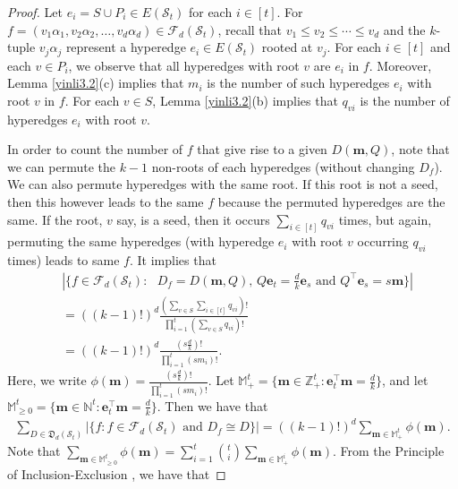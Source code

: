 \documentclass{article}
\begin{document}
\begin{proof}
Let $e_{i}=S \cup P_{i} \in E(\mathcal{S}_t)$ for each $i \in [t]$.
For $f=(v_1\alpha_1,v_2\alpha_2,\ldots,v_d\alpha_d) \in \mathcal{F}_{d}(\mathcal{S}_t)$, recall that $v_1\leq v_2\leq \cdots \leq v_d$ and
the $k$-tuple $v_j\alpha_j$ represent a hyperedge $e_i \in E(\mathcal{S}_t)$ rooted at $v_j$.
For each $i \in [t]$ and each $v \in P_i$, we observe that all hyperedges with root $v$ are $e_i$ in $f$. Moreover,
Lemma  \ref{yinli3.2}(c) implies that $m_i$ is the number of such hyperedges $e_i$ with root $v$  in $f$.
For each $v \in S$,  Lemma  \ref{yinli3.2}(b) implies that $q_{vi}$ is the number of hyperedges $e_i$ with root $v$.

In order to count the number of $f$ that give rise to a given $D(\mathbf{m},Q)$, note that we can permute the $k-1$ non-roots of each hyperedges (without changing  $D_f$).
We can also permute hyperedges with the same root.
If this root is not a seed, then this however leads to the same $f$ because the permuted hyperedges are the same.
If the root, $v$ say, is a seed, then it occurs $\sum_{i \in [t]}q_{vi}$ times, but again, permuting the same hyperedges (with hyperedge $e_i$ with root $v$ occurring $q_{vi}$ times) leads to same $f$. It implies that
\begin{align*}
   &|\{f\in\mathcal{F}_{d}(\mathcal{S}_t):\mbox{  $D_{f} = D(\mathbf{m},Q)$, $Q\mathbf{e}_t=\frac{d}{k}\mathbf{e}_s$ and $Q^{\top}\mathbf{e}_s=s\mathbf{m}$}\}| \\
   & = ((k-1)!)^{d}\frac{(\sum_{v\in S}\sum_{i\in[t]}q_{vi})!}{\prod_{i=1}^{t}(\sum_{v \in S}q_{vi})!}\\
   &=((k-1)!)^{d}\frac{(s\frac{d}{k})!}{\prod_{i=1}^{t}(sm_{i})!}.
\end{align*}
Here, we write $\phi(\mathbf{m})=\frac{(s\frac{d}{k})!}{\prod_{i=1}^{t}(sm_{i})!}$.
Let $\mathbb{M}^t_{+}=\{\mathbf{m} \in \mathbb{Z}_{+}^t: \mathbf{e}_t^\top\mathbf{m}=\frac{d}{k} \}$, and let $\mathbb{M}^t_{\geq 0}=\{\mathbf{m} \in \mathbb{N}^t: \mathbf{e}_t^\top\mathbf{m}=\frac{d}{k} \}$.
Then we have that
\begin{align*}
\sum_{D\in\mathfrak{D}_{d}(\mathcal{S}_t)}|\{f:\mbox{$f\in\mathcal{F}_{d}(\mathcal{S}_t)$ and $D_{f}\cong D$}\}| =((k-1)!)^{d}\sum_{\mathbf{m} \in \mathbb{M}^t_{+}}\phi(\mathbf{m}).
\end{align*}
Note that $\sum_{\mathbf{m} \in \mathbb{M}^t_{\geq 0}}\phi(\mathbf{m})=\sum_{i=1}^{t}\binom{t}{i}\sum_{\mathbf{m} \in \mathbb{M}^i_{+}}\phi(\mathbf{m})$.
From the Principle of Inclusion-Exclusion \cite{Stanley2012enumerative}, we have that

\end{proof}
\end{document}
